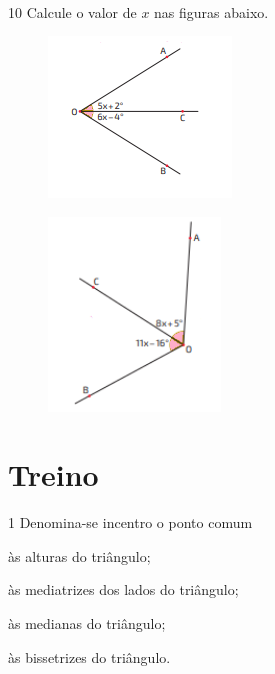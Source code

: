 {{\\

\num{10} Calcule o valor de $x$ nas figuras abaixo.

\begin{multicols}{2}
\begin{escolha}
\item
\begin{figure}[H]
\centering\includegraphics[width=1.91667in,height=1.6875in]{./imgSAEB_8_MAT/media/image33.png}
\end{figure}  
\item
\begin{figure}[H]
\centering\includegraphics[width=1.80208in,height=2.02917in]{./imgSAEB_8_MAT/media/image34.png}
\end{figure}  
\end{escolha}
\end{multicols}

\pagebreak

\section*{Treino}

\num{1} Denomina-se incentro o ponto comum

\begin{escolha}[itemsep=0pt]
\item às alturas do triângulo;
\item às mediatrizes dos lados do triângulo;
\item às medianas do triângulo;
\item às bissetrizes do triângulo. 
\end{escolha}

}}
